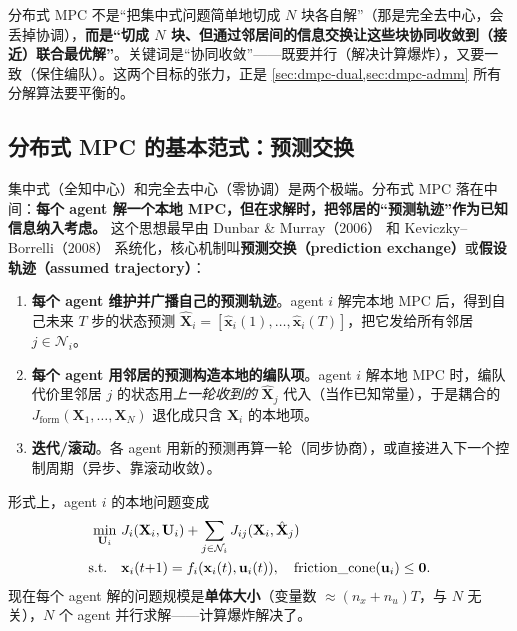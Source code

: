 \begin{insight}\label{ins:dmpc-not-split}
分布式 MPC 不是“把集中式问题简单地切成 $N$ 块各自解”（那是完全去中心，会丢掉协调），\textbf{而是“切成 $N$ 块、但通过邻居间的信息交换让这些块协同收敛到（接近）联合最优解”}。关键词是“协同收敛”——既要并行（解决计算爆炸），又要一致（保住编队）。这两个目标的张力，正是 \cref{sec:dmpc-dual,sec:dmpc-admm} 所有分解算法要平衡的。
\end{insight}

\subsection{分布式 MPC 的基本范式：预测交换}
\label{sec:dmpc-prediction-exchange}

集中式（全知中心）和完全去中心（零协调）是两个极端。分布式 MPC 落在中间：\textbf{每个 agent 解一个本地 MPC，但在求解时，把邻居的“预测轨迹”作为已知信息纳入考虑。} 这个思想最早由 Dunbar \& Murray（$2006$）\cite{dunbar2006distributed} 和 Keviczky--Borrelli（$2008$）\cite{keviczky2008decentralized} 系统化，核心机制叫\textbf{预测交换（prediction exchange）}或\textbf{假设轨迹（assumed trajectory）}：
\begin{enumerate}
  \item \textbf{每个 agent 维护并广播自己的预测轨迹}。agent $i$ 解完本地 MPC 后，得到自己未来 $T$ 步的状态预测 $\hat{\mathbf{X}}_i=[\hat{\mathbf{x}}_i(1),\dots,\hat{\mathbf{x}}_i(T)]$，把它发给所有邻居 $j\in\mathcal{N}_i$。
  \item \textbf{每个 agent 用邻居的预测构造本地的编队项}。agent $i$ 解本地 MPC 时，编队代价里邻居 $j$ 的状态用\emph{上一轮收到的} $\hat{\mathbf{X}}_j$ 代入（当作已知常量），于是耦合的 $J_{\text{form}}(\mathbf{X}_1,\dots,\mathbf{X}_N)$ 退化成只含 $\mathbf{X}_i$ 的本地项。
  \item \textbf{迭代/滚动}。各 agent 用新的预测再算一轮（同步协商），或直接进入下一个控制周期（异步、靠滚动收敛）。
\end{enumerate}
形式上，agent $i$ 的本地问题变成
\begin{align}
  \min_{\mathbf{U}_i}\ & J_i(\mathbf{X}_i,\mathbf{U}_i) + \sum_{j\in\mathcal{N}_i} J_{ij}(\mathbf{X}_i, \hat{\mathbf{X}}_j) \label{eq:dmpc-pred-exchange}\\
  \text{s.t.}\quad & \mathbf{x}_i(t{+}1)=f_i(\mathbf{x}_i(t),\mathbf{u}_i(t)),\quad \text{friction\_cone}(\mathbf{u}_i)\le\mathbf{0}.\notag
\end{align}
现在每个 agent 解的问题规模是\textbf{单体大小}（变量数 $\approx(n_x+n_u)T$，与 $N$ 无关），$N$ 个 agent 并行求解——计算爆炸解决了。

